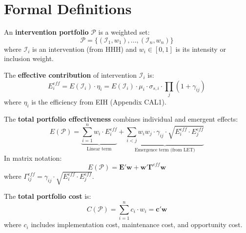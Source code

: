 \section{Formal Definitions}
\label{sec:mep-definitions}

\begin{definition}
\label{def:portfolio}
An \textbf{intervention portfolio} $\mathcal{P}$ is a weighted set:
\begin{equation}
\mathcal{P} = \{(\mathcal{I}_1, w_1), \ldots, (\mathcal{I}_n, w_n)\}
\end{equation}
where $\mathcal{I}_i$ is an intervention (from HHH) and $w_i \in [0, 1]$ is its
intensity or inclusion weight.
\end{definition}

\begin{definition}
\label{def:individual-effect}
The \textbf{effective contribution} of intervention $\mathcal{I}_i$ is:
\begin{equation}
E_i^{eff} = E(\mathcal{I}_i) \cdot \eta_i = E(\mathcal{I}_i) \cdot \mu_i \cdot \sigma_{s,i} \cdot \prod_j (1 + \gamma_{ij})
\end{equation}
where $\eta_i$ is the efficiency from EIH (Appendix CAL1).
\end{definition}

\begin{definition}
\label{def:portfolio-effect}
The \textbf{total portfolio effectiveness} combines individual and emergent effects:
\begin{equation}
E(\mathcal{P}) = \underbrace{\sum_{i=1}^{n} w_i \cdot E_i^{eff}}_{\text{Linear term}} +
\underbrace{\sum_{i<j} w_i w_j \cdot \gamma_{ij} \cdot \sqrt{E_i^{eff} \cdot E_j^{eff}}}_{\text{Emergence term (from LET)}}
\label{eq:portfolio-effectiveness}
\end{equation}
In matrix notation:
\begin{equation}
E(\mathcal{P}) = \mathbf{E}'\mathbf{w} + \mathbf{w}'\boldsymbol{\Gamma}^{eff}\mathbf{w}
\end{equation}
where $\Gamma^{eff}_{ij} = \gamma_{ij} \cdot \sqrt{E_i^{eff} \cdot E_j^{eff}}$.
\end{definition}

\begin{definition}
\label{def:portfolio-cost}
The \textbf{total portfolio cost} is:
\begin{equation}
C(\mathcal{P}) = \sum_{i=1}^{n} c_i \cdot w_i = \mathbf{c}'\mathbf{w}
\end{equation}
where $c_i$ includes implementation cost, maintenance cost, and opportunity cost.
\end{definition}

